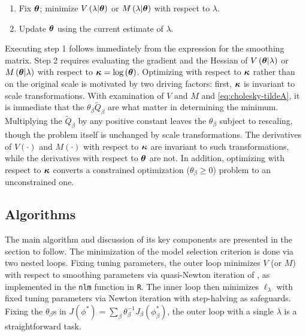 \documentclass[12pt]{article}
\newcommand{\bftheta}{\mbox{\boldmath $\theta$}}
\newcommand{\bfkappa}{\mbox{\boldmath $\kappa$}}
\newcommand{\tildeQ}{\tilde{Q}}
\theoremstyle{definition}
\begin{document}
\begin{enumerate}
\item Fix $\bftheta$; minimize $V\left(\lambda \vert \bftheta\right)$ or $M\left(\lambda \vert \bftheta\right)$ with respect to $\lambda$.
\item Update $\bftheta$ using the current estimate of $\lambda$.
\end{enumerate}
\noindent
Executing step 1 follows immediately from the expression for the smoothing matrix. Step 2 requires evaluating the gradient and the Hessian of $V\left( \bftheta \vert \lambda \right)$ or $M\left(\bftheta \vert \lambda\right)$ with respect to $\bfkappa = \log\left(\bftheta\right)$. Optimizing with respect to $\bfkappa$ rather than on the original scale is motivated by two driving factors: first, $\bfkappa$ is invariant to scale transformations. With examination of $V$ and $M$ and \ref{eq:cholesky-tildeA}, it is immediate that the $\theta_\beta \tildeQ_\beta$ are what matter in determining the minimum. Multiplying the $\tildeQ_\beta$ by any positive constant leaves the $\theta_\beta$ subject to rescaling, though the problem itself is unchanged by scale transformations. The derivatives of $V\left(\cdot\right)$ and $M\left(\cdot\right)$ with respect to $\bfkappa$ are invariant to such transformations, while the derivatives with respect to $\bftheta$ are not. In addition, optimizing with respect to $\bfkappa$ converts a constrained optimization ($\theta_\beta \ge 0$) problem to an unconstrained one.

\subsection{Algorithms}

The main algorithm and discussion of its key components are presented in the section to follow. The minimization of the model selection criterion is done via two nested loops. Fixing tuning parameters, the outer loop minimizes $V$ (or $M$) with respect to smoothing parameters via quasi-Newton iteration of \citet{dennis1996numerical}, as implemented in the \texttt{nlm} function in \texttt{R}. The inner loop then minimizes $\ell_\lambda$ with fixed tuning parameters via Newton iteration with step-halving as safeguards. Fixing the $\theta_\beta$s in $J \left(\phi^*\right) = \sum_\beta \theta^{-1}_\beta J_\beta \left(\phi_\beta^*\right)$, the outer loop with a single $\lambda$ is a straightforward task. 
\end{document}
